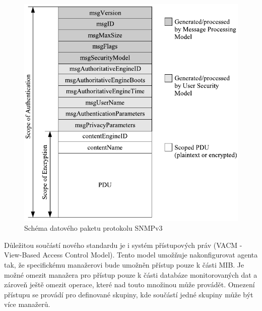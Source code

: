 \begin{figure}[htp]
	\begin{center}
		\includegraphics{obrazky/02_snmpv3_pdu.pdf}
		\caption{Schéma datového paketu protokolu SNMPv3}
		\label{obr_snmp4}
	\end{center}
\end{figure}

\newpage

Důležitou součástí nového standardu je i systém přístupových práv (VACM - View-Based Access Control Model). Tento model umožňuje nakonfigurovat agenta tak, 
že specifickému manažerovi bude umožněn přístup pouze k části MIB. Je možné omezit manažera pro přístup pouze k části databáze monitorovaných dat a 
zároveň ještě omezit operace, které nad touto množinou může provádět. Omezení přístupu se provádí pro definované skupiny, kde součástí jedné skupiny může být
více manažerů.

